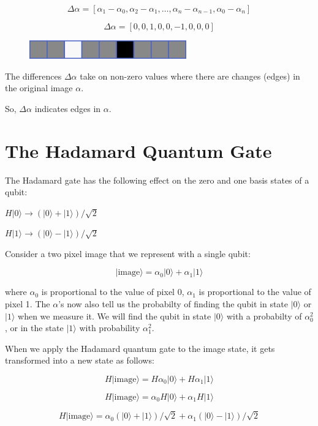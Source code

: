 \documentclass[11pt]{article}
\makeatletter
\def\maxwidth{\ifdim\Gin@nat@width>\linewidth\linewidth
    \else\Gin@nat@width\fi}
\let\Oldincludegraphics\includegraphics
\renewcommand{\includegraphics}[1]{\Oldincludegraphics[width=.8\maxwidth]{#1}}
\makeatother
\begin{document}
\[\Delta \alpha = [\alpha_1-\alpha_0, \alpha_2-\alpha_1, \ldots, \alpha_n-\alpha_{n-1},\alpha_0-\alpha_n]\]

\[\Delta \alpha = [0,0,1,0,0,-1,0,0,0]\]

\begin{figure}[h]
\centering
\includegraphics{../img/dp.png}
\end{figure}

The differences \(\Delta \alpha\) take on non-zero values where there
are changes (edges) in the original image \(\alpha\).

So, \(\Delta \alpha\) indicates edges in \(\alpha\).

    \hypertarget{the-hadamard-quantum-gate}{%
\section{The Hadamard Quantum Gate}\label{the-hadamard-quantum-gate}}

    The Hadamard gate has the following effect on the zero and one basis
states of a qubit:

\(H|0\rangle \rightarrow (|0\rangle + |1\rangle)/\sqrt{2}\)

\(H|1\rangle \rightarrow (|0\rangle - |1\rangle)/\sqrt{2}\)

Consider a two pixel image that we represent with a single qubit:

\[|\textrm{image}\rangle = \alpha_0 |0\rangle + \alpha_1 |1\rangle\]

where \(\alpha_0\) is proportional to the value of pixel 0, \(\alpha_1\)
is proportional to the value of pixel 1. The \(\alpha\)'s now also tell
us the probabilty of finding the qubit in state \(|0\rangle\) or
\(|1\rangle\) when we measure it. We will find the qubit in state
\(|0\rangle\) with a probabilty of \(\alpha_0^2\), or in the state
\(|1\rangle\) with probability \(\alpha_1^2\).

    When we apply the Hadamard quantum gate to the image state, it gets
transformed into a new state as follows:

\[H|\textrm{image}\rangle = H \alpha_0 |0\rangle + H \alpha_1 |1\rangle\]

\[H|\textrm{image}\rangle = \alpha_0 H |0\rangle + \alpha_1 H |1\rangle\]

\[H|\textrm{image}\rangle = \alpha_0 (|0\rangle + |1\rangle)/\sqrt{2} + \alpha_1 (|0\rangle - |1\rangle)/\sqrt{2}\]
\end{document}
